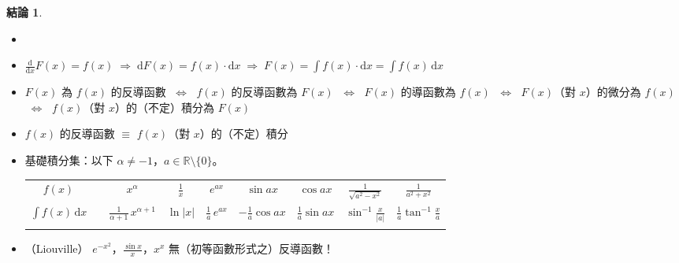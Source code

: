 \documentclass[12pt]{extarticle}
\newcommand{\ds}{\displaystyle}
\newcommand{\ie}{\;\Longrightarrow\;}
\newcommand{\ifff}{\;\Longleftrightarrow\;}
\theoremstyle{definition}
\newtheorem*{fact}{結論}
\begin{document}
\begin{fact}
  \begin{itemize}\setlength\itemsep{0em}
    \item[]
    \item $\ds\frac{\text{d}}{\text{d}x} F(x) = f(x)\ie \text{d} F(x) = f(x)\cdot\text{d}x \ie F(x) = \int f(x)\cdot\text{d}x = \int f(x)\,\text{d}x$
    \item $F(x)$ 為 $f(x)$ 的反導函數 $\ifff$ $f(x)$ 的反導函數為 $F(x)$ $\ifff$ $F(x)$ 的導函數為 $f(x)$ $\ifff$ $F(x)$（對 $x$）的微分為 $f(x)$ $\ifff$ $f(x)$（對 $x$）的（不定）積分為 $F(x)$ 
    \item $f(x)$ 的反導函數 $\equiv$ $f(x)$（對 $x$）的（不定）積分
    \item 基礎積分集：以下 $\ds\alpha\ne -1$，$a\in\mathbb{R}\setminus\{0\}$。
      \begin{table}[!htbp]
        \centering
        \begin{tabular}{c|cccccccc}
          \toprule
          \addlinespace[2mm]
          $\ds f(x)$ & & $\ds x^\alpha$ & $\ds\frac{1}{x}$ & $\ds e^{a x}$ & $\ds\sin ax$ & $\ds\cos ax$ & $\ds\frac{1}{\sqrt{a^2 - x^2}}$ & $\ds\frac{1}{a^2 + x^2}$ \\
          \addlinespace[2mm]
          \midrule
          \addlinespace[2mm]
          $\ds \int f(x)\,\text{d}x$ & & $\ds\frac{1}{\alpha + 1}\,x^{\alpha + 1}$ & $\ds\ln |x|$ & $\ds\frac{1}{a}\,e^{a x}$ & $\ds-\frac{1}{a}\cos ax$ & $\ds\frac{1}{a}\sin ax$ & $\ds\sin^{-1}\frac{x}{|a|}$ & $\ds\frac{1}{a}\tan^{-1}\frac{x}{a}$ \\
          \addlinespace[2mm]
          \bottomrule
        \end{tabular}
      \end{table}
    \item（Liouville）{\color{M4} $\ds e^{-x^2}$，$\ds\frac{\sin x}{x}$，$\ds x^x$ 無（初等函數形式之）反導函數！}
  \end{itemize}
\end{fact}
\end{document}
